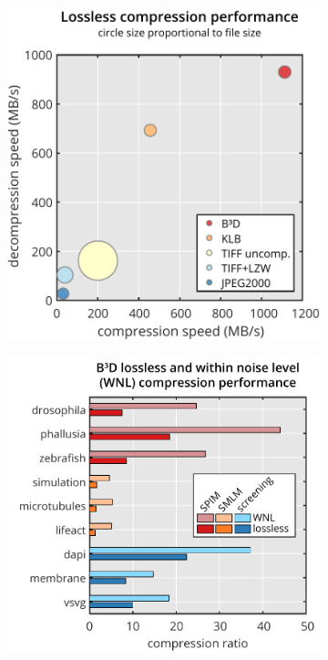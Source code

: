     \begin{figure}[tpb]
      \centering
      \begin{subfigure}{0.49\textwidth}
        \centering
        \includegraphics[page=1,height=0.9\textwidth]{bubbles}
        \caption{}
      \end{subfigure}      
      \begin{subfigure}{0.49\textwidth}
        \centering
        \includegraphics[page=1,height=0.9\textwidth]{Fig1c_compressionBars}

\end{subfigure}
\end{figure}
